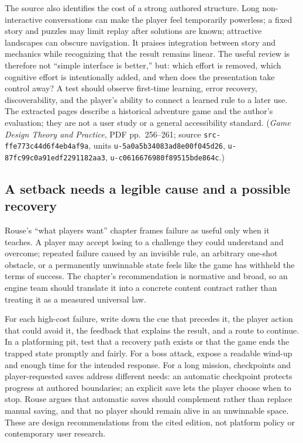 The source also identifies the cost of a strong authored structure. Long non-interactive conversations can make the player feel temporarily powerless; a fixed story and puzzles may limit replay after solutions are known; attractive landscapes can obscure navigation. It praises integration between story and mechanics while recognizing that the result remains linear. The useful review is therefore not ``simple interface is better,'' but: which effort is removed, which cognitive effort is intentionally added, and when does the presentation take control away? A test should observe first-time learning, error recovery, discoverability, and the player's ability to connect a learned rule to a later use. The extracted pages describe a historical adventure game and the author's evaluation; they are not a user study or a general accessibility standard. (\emph{Game Design Theory and Practice}, PDF pp.~256--261; source \texttt{src-ffe773c44d6f4eb4af9a}, units \texttt{u-5a0a5b34083ad8e00f045d26}, \texttt{u-87fc99c0a91edf2291182aa3}, \texttt{u-c0616676980f89515bde864c}.)

\subsection{A setback needs a legible cause and a possible recovery}\label{a-setback-needs-a-legible-cause-and-a-possible-recovery}

Rouse's ``what players want'' chapter frames failure as useful only when it teaches. A player may accept losing to a challenge they could understand and overcome; repeated failure caused by an invisible rule, an arbitrary one-shot obstacle, or a permanently unwinnable state feels like the game has withheld the terms of success. The chapter's recommendation is normative and broad, so an engine team should translate it into a concrete content contract rather than treating it as a measured universal law.

For each high-cost failure, write down the cue that precedes it, the player action that could avoid it, the feedback that explains the result, and a route to continue. In a platforming pit, test that a recovery path exists or that the game ends the trapped state promptly and fairly. For a boss attack, expose a readable wind-up and enough time for the intended response. For a long mission, checkpoints and player-requested saves address different needs: an automatic checkpoint protects progress at authored boundaries; an explicit save lets the player choose when to stop. Rouse argues that automatic saves should complement rather than replace manual saving, and that no player should remain alive in an unwinnable space. These are design recommendations from the cited edition, not platform policy or contemporary user research.

